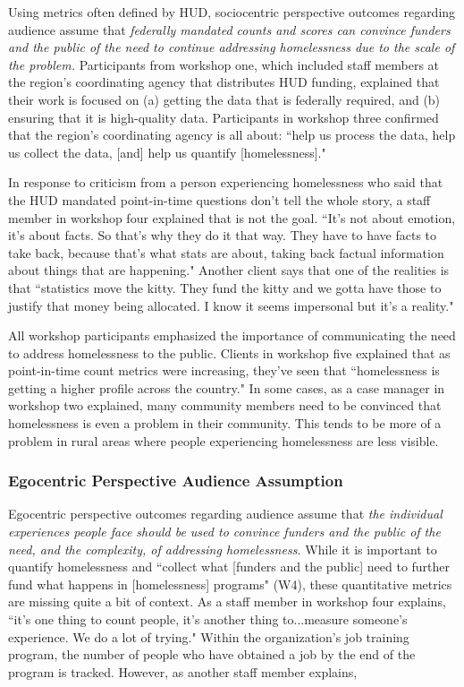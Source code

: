 Using metrics often defined by HUD, sociocentric perspective outcomes regarding audience assume that \textit{federally mandated counts and scores can convince funders and the public of the need to continue addressing homelessness due to the scale of the problem.} Participants from workshop one, which included staff members at the region's coordinating agency that distributes HUD funding, explained that their work is focused on (a) getting the data that is federally required, and (b) ensuring that it is high-quality data. Participants in workshop three confirmed that the region's coordinating agency is all about: ``help us process the data, help us collect the data, [and] help us quantify [homelessness]."

In response to criticism from a person experiencing homelessness who said that the HUD mandated point-in-time questions don't tell the whole story, a staff member in workshop four explained that is not the goal. ``It's not about emotion, it's about facts. So that's why they do it that way. They have to have facts to take back, because that's what stats are about, taking back factual information about things that are happening." Another client says that one of the realities is that ``statistics move the kitty. They fund the kitty and we gotta have those to justify that money being allocated. I know it seems impersonal but it's a reality."

All workshop participants emphasized the importance of communicating the need to address homelessness to the public. Clients in workshop five explained that as point-in-time count metrics were increasing, they've seen that ``homelessness is getting a higher profile across the country." In some cases, as a case manager in workshop two explained, many community members need to be convinced that homelessness is even a problem in their community. This tends to be more of a problem in rural areas where people experiencing homelessness are less visible.

\subsubsection{Egocentric Perspective Audience Assumption}

Egocentric perspective outcomes regarding audience assume that \textit{the individual experiences people face should be used to convince funders and the public of the need, and the complexity, of addressing homelessness.} While it is important to quantify homelessness and ``collect what [funders and the public] need to further fund what happens in [homelessness] programs" (W4), these quantitative metrics are missing quite a bit of context. As a staff member in workshop four explains, ``it's one thing to count people, it's another thing to...measure someone's experience. We do a lot of trying." Within the organization's job training program, the number of people who have obtained a job by the end of the program is tracked. However, as another staff member explains,


